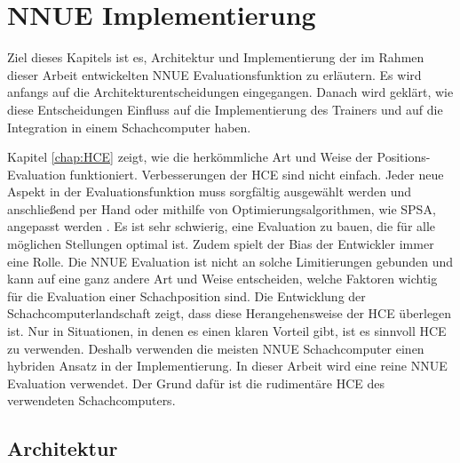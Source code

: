 \chapter{NNUE Implementierung}

Ziel dieses Kapitels ist es, Architektur und Implementierung der im Rahmen dieser Arbeit entwickelten \ac{NNUE} Evaluationsfunktion zu erläutern. Es wird anfangs auf die Architekturentscheidungen eingegangen. Danach wird geklärt, wie diese Entscheidungen Einfluss auf die Implementierung des Trainers und auf die Integration in einem Schachcomputer haben.

Kapitel \autoref{chap:HCE} zeigt, wie die herkömmliche Art und Weise der Positions-Evaluation funktioniert. Verbesserungen der \ac{HCE} sind nicht einfach. Jeder neue Aspekt in der Evaluationsfunktion muss sorgfältig ausgewählt werden und anschließend per Hand oder mithilfe von Optimierungsalgorithmen, wie \zb{} \ac{SPSA}, angepasst werden \cite{spall1992multivariate}. Es ist sehr schwierig, eine Evaluation zu bauen, die für alle möglichen Stellungen optimal ist. Zudem spielt der Bias der Entwickler immer eine Rolle. Die \ac{NNUE} Evaluation ist nicht an solche Limitierungen gebunden und kann auf eine ganz andere Art und Weise entscheiden, welche Faktoren wichtig für die Evaluation einer Schachposition sind. Die Entwicklung der Schachcomputerlandschaft zeigt, dass diese Herangehensweise der \ac{HCE} überlegen ist. Nur in Situationen, in denen es einen klaren Vorteil gibt, ist es sinnvoll \ac{HCE} zu verwenden. Deshalb verwenden die meisten \ac{NNUE} Schachcomputer einen hybriden Ansatz in der Implementierung. In dieser Arbeit wird eine reine \ac{NNUE} Evaluation verwendet. Der Grund dafür ist die rudimentäre \ac{HCE} des verwendeten Schachcomputers.


\section{Architektur}

